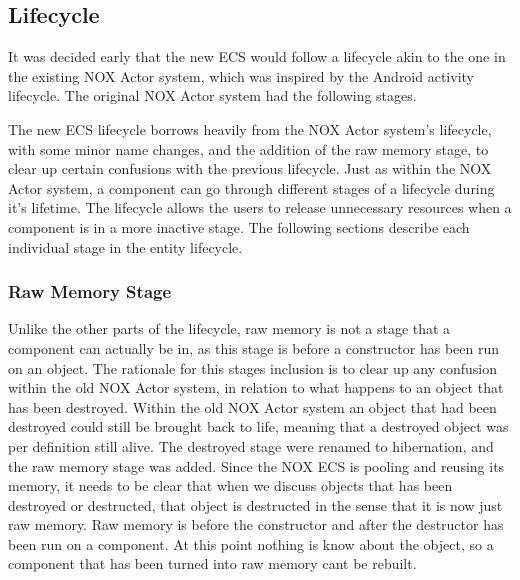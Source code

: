 \subsection{Lifecycle}
\label{subsec:high_level_lifecycle}
It was decided early that the new ECS would follow a lifecycle akin to the one in the existing NOX Actor system,
which was inspired by the Android activity lifecycle\cite{android_activity_lifecycle}.
The original NOX Actor system had the following stages.

The new ECS lifecycle borrows heavily from the NOX Actor system's lifecycle, with some minor name changes,
and the addition of the raw memory stage, to clear up certain confusions with the previous lifecycle.
Just as within the NOX Actor system, a component can go through different stages of a lifecycle during it's lifetime.
The lifecycle allows the users to release unnecessary resources when a component is in a more inactive stage.
The following sections describe each individual stage in the entity lifecycle.


\subsubsection{Raw Memory Stage}
Unlike the other parts of the lifecycle, raw memory is not a stage that a component can actually be in,
as this stage is before a constructor has been run on an object.
The rationale for this stages inclusion is to clear up any confusion within the old NOX Actor system,
in relation to what happens to an object that has been destroyed.
Within the old NOX Actor system an object that had been destroyed could still be brought back to life,
meaning that a destroyed object was per definition still alive.
The destroyed stage were renamed to hibernation, and the raw memory stage was added.
Since the NOX ECS is pooling and reusing its memory, it needs to be clear that when we discuss objects
that has been destroyed or destructed, that object is destructed in the sense that it is now just raw memory.
Raw memory is before the constructor and after the destructor has been run on a component.
At this point nothing is know about the object, so a component that has been turned into raw memory cant be rebuilt.


